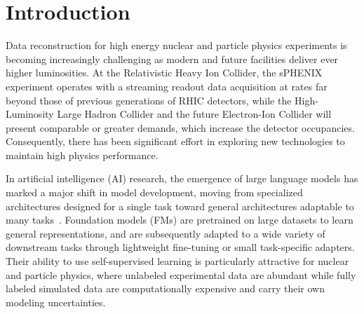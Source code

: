 \documentclass[aps,physrev,twocolumn,superscriptaddress]{revtex4-2}
\begin{document}
\maketitle

\linenumbers


\section{Introduction}
Data reconstruction for high energy nuclear and particle physics experiments is becoming increasingly challenging as modern and future facilities deliver ever higher luminosities. At the Relativistic Heavy Ion Collider, the sPHENIX experiment operates with a streaming readout data acquisition at rates far beyond those of previous generations of RHIC detectors, while the High-Luminosity Large Hadron Collider and the future Electron-Ion Collider will present comparable or greater demands, which increase the detector occupancies. Consequently, there has been significant effort in exploring new technologies to maintain high physics performance.   

In artificial intelligence (AI) research, the emergence of large language models has marked a major shift in model development, moving from specialized architectures designed for a single task toward general architectures adaptable to many tasks~\cite{Vaswani:2017}. Foundation models (FMs) are pretrained on large datasets to learn general representations, and are subsequently adapted to a wide variety of downstream tasks through lightweight fine-tuning or small task-specific adapters.  
Their ability to use self-supervised learning is particularly attractive for nuclear and particle physics, where unlabeled experimental data are abundant while fully labeled simulated data are computationally expensive and carry their own modeling uncertainties.
\end{document}
